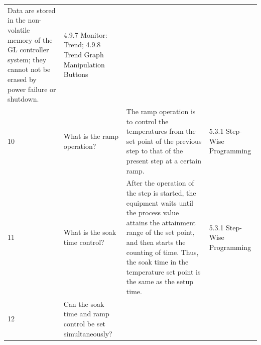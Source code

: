 \begin{longtable}[]{@{}llll@{}}
\begin{minipage}[t]{0.33\columnwidth}
Data are stored in the non-volatile memory of the GL controller system;
they cannot not be erased by power failure or shutdown.\strut
\end{minipage} & \begin{minipage}[t]{0.17\columnwidth}\raggedright
4.9.7 Monitor: Trend; 4.9.8 Trend Graph Manipulation Buttons\strut
\end{minipage}\tabularnewline
\begin{minipage}[t]{0.08\columnwidth}\raggedright
10\strut
\end{minipage} & \begin{minipage}[t]{0.30\columnwidth}\raggedright
What is the ramp operation?\strut
\end{minipage} & \begin{minipage}[t]{0.33\columnwidth}\raggedright
The ramp operation is to control the temperatures from the set point of
the previous step to that of the present step at a certain ramp.\strut
\end{minipage} & \begin{minipage}[t]{0.17\columnwidth}\raggedright
5.3.1 Step-Wise Programming\strut
\end{minipage}\tabularnewline
\begin{minipage}[t]{0.08\columnwidth}\raggedright
11\strut
\end{minipage} & \begin{minipage}[t]{0.30\columnwidth}\raggedright
What is the soak time control?\strut
\end{minipage} & \begin{minipage}[t]{0.33\columnwidth}\raggedright
After the operation of the step is started, the equipment waits until
the process value attains the attainment range of the set point, and
then starts the counting of time. Thus, the soak time in the temperature
set point is the same as the setup time.\strut
\end{minipage} & \begin{minipage}[t]{0.17\columnwidth}\raggedright
5.3.1 Step-Wise Programming\strut
\end{minipage}\tabularnewline
\begin{minipage}[t]{0.08\columnwidth}\raggedright
12\strut
\end{minipage} & \begin{minipage}[t]{0.30\columnwidth}\raggedright
Can the soak time and ramp control be set simultaneously?\strut
\end{minipage} & \begin{minipage}[t]{0.33\columnwidth}\raggedright

\end{minipage}
\end{longtable}
